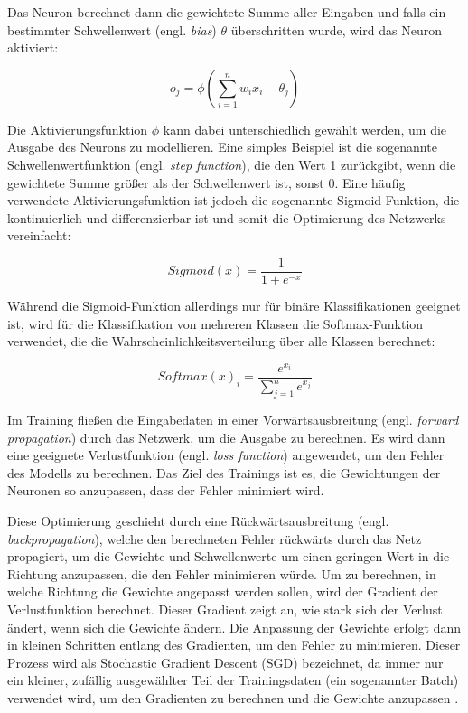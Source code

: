 Das Neuron berechnet dann die gewichtete Summe aller Eingaben und falls ein bestimmter Schwellenwert (engl. \textit{bias}) $\theta$ überschritten wurde, wird das Neuron aktiviert:

\begin{equation}
	o_j = \phi \left( \sum_{i=1}^{n} w_i x_i - \theta_j \right)
	\label{eq:mp-neuron}
\end{equation}

Die Aktivierungsfunktion $\phi$ kann dabei unterschiedlich gewählt werden, um die Ausgabe des Neurons zu modellieren. Eine simples Beispiel ist die sogenannte Schwellenwertfunktion (engl. \textit{step function}), die den Wert 1 zurückgibt, wenn die gewichtete Summe größer als der Schwellenwert ist, sonst 0. Eine häufig verwendete Aktivierungsfunktion ist jedoch die sogenannte Sigmoid-Funktion, die kontinuierlich und differenzierbar ist und somit die Optimierung des Netzwerks vereinfacht:

\begin{equation}
	\textit{Sigmoid}(x) = \frac{1}{1 + e^{-x}}
	\label{eq:sigmoid}
\end{equation}

Während die Sigmoid-Funktion allerdings nur für binäre Klassifikationen geeignet ist, wird für die Klassifikation von mehreren Klassen die Softmax-Funktion verwendet, die die Wahrscheinlichkeitsverteilung über alle Klassen berechnet:

\begin{equation}
	\textit{Softmax}(x)_i = \frac{e^{x_i}}{\sum_{j=1}^{n} e^{x_j}}
	\label{eq:softmax}
\end{equation}

Im Training fließen die Eingabedaten in einer Vorwärtsausbreitung (engl. \textit{forward propagation}) durch das Netzwerk, um die Ausgabe zu berechnen. Es wird dann eine geeignete Verlustfunktion (engl. \textit{loss function}) angewendet, um den Fehler des Modells zu berechnen. Das Ziel des Trainings ist es, die Gewichtungen der Neuronen so anzupassen, dass der Fehler minimiert wird.

Diese Optimierung geschieht durch eine Rückwärtsausbreitung (engl. \textit{backpropagation}), welche den berechneten Fehler rückwärts durch das Netz propagiert, um die Gewichte und Schwellenwerte um einen geringen Wert in die Richtung anzupassen, die den Fehler minimieren würde. Um zu berechnen, in welche Richtung die Gewichte angepasst werden sollen, wird der Gradient der Verlustfunktion berechnet. Dieser Gradient zeigt an, wie stark sich der Verlust ändert, wenn sich die Gewichte ändern. Die Anpassung der Gewichte erfolgt dann in kleinen Schritten entlang des Gradienten, um den Fehler zu minimieren. Dieser Prozess wird als Stochastic Gradient Descent (SGD) bezeichnet, da immer nur ein kleiner, zufällig ausgewählter Teil der Trainingsdaten (ein sogenannter Batch) verwendet wird, um den Gradienten zu berechnen und die Gewichte anzupassen \parencite{Goodfellow2016deeplearning}.

